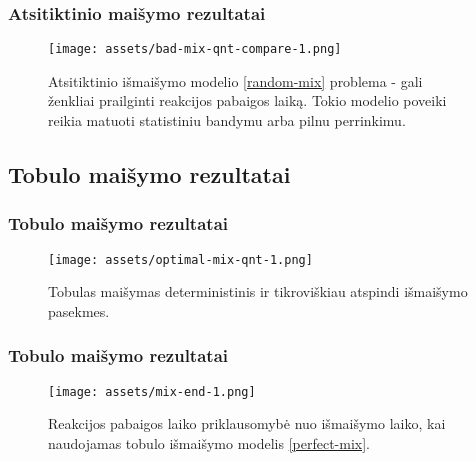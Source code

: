 \documentclass{beamer}
\begin{document}
\begin{frame}
    \frametitle{Atsitiktinio maišymo rezultatai}
    \begin{figure}
        \centering
        \texttt{[image: assets/bad-mix-qnt-compare-1.png]}
        \caption{Atsitiktinio išmaišymo modelio \eqref{random-mix} problema - gali ženkliai prailginti reakcijos pabaigos laiką. Tokio modelio poveiki reikia matuoti statistiniu bandymu arba pilnu perrinkimu. }
    \end{figure}
\end{frame}

\subsection{Tobulo maišymo rezultatai}
\begin{frame}
\frametitle{Tobulo maišymo rezultatai}
\begin{figure}
\centering
\texttt{[image: assets/optimal-mix-qnt-1.png]}
\caption{Tobulas maišymas deterministinis ir tikroviškiau atspindi išmaišymo pasekmes.}
\end{figure}
\end{frame}

\begin{frame}
    \frametitle{Tobulo maišymo rezultatai}
    \begin{figure}
        \centering
        \texttt{[image: assets/mix-end-1.png]}
        \caption{Reakcijos pabaigos laiko priklausomybė nuo išmaišymo laiko, kai naudojamas tobulo išmaišymo modelis \eqref{perfect-mix}.}
    \end{figure}
\end{frame}
\end{document}
